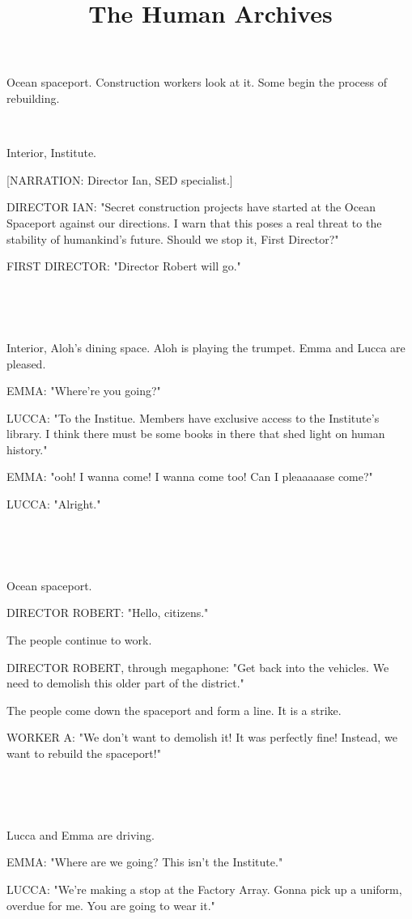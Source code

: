 \documentclass[11pt]{article}
\begin{document}
\ttfamily
\title{The Human Archives}
\maketitle

Ocean spaceport.
Construction workers look at it.
Some begin the process of rebuilding.

\ 

Interior, Institute.

[NARRATION: Director Ian, SED specialist.]

DIRECTOR IAN: "Secret construction projects have started at the Ocean Spaceport against our directions. 
I warn that this poses a real threat to the stability of humankind's future.
Should we stop it, First Director?"

FIRST DIRECTOR: "Director Robert will go."

\ 

\ 

Interior, Aloh's dining space.
Aloh is playing the trumpet.
Emma and Lucca are pleased.

EMMA: "Where're you going?"

LUCCA: "To the Institue.
Members have exclusive access to the Institute's library.
I think there must be some books in there that shed light on human history."

EMMA: "ooh! I wanna come! I wanna come too! Can I pleaaaaase come?"

LUCCA: "Alright."

\ 

\ 

Ocean spaceport.

DIRECTOR ROBERT: "Hello, citizens."

The people continue to work.

DIRECTOR ROBERT, through megaphone: "Get back into the vehicles.
We need to demolish this older part of the district."

The people come down the spaceport and form a line.
It is a strike.

WORKER A: "We don't want to demolish it! It was perfectly fine!
Instead, we want to rebuild the spaceport!"

\ 

\ 

Lucca and Emma are driving.

EMMA: "Where are we going? This isn't the Institute."

LUCCA: "We're making a stop at the Factory Array.
Gonna pick up a uniform, overdue for me.
You are going to wear it."
\end{document}
